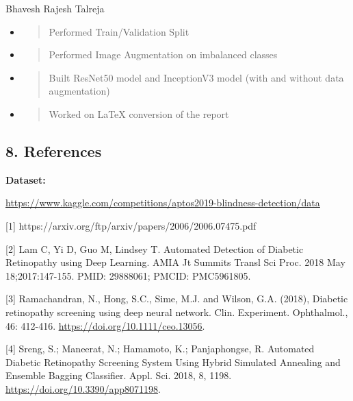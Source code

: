 \documentclass[
]{article}
\begin{document}
Bhavesh Rajesh Talreja

\begin{itemize}
\item
  \begin{quote}
  Performed Train/Validation Split
  \end{quote}
\end{itemize}

\begin{itemize}
\item
  \begin{quote}
  Performed Image Augmentation on imbalanced classes
  \end{quote}
\item
  \begin{quote}
  Built ResNet50 model and InceptionV3 model (with and without data
  augmentation)
  \end{quote}
\item
  \begin{quote}
  Worked on LaTeX conversion of the report
  \end{quote}
\end{itemize}

\hypertarget{references}{%
\subsection{\texorpdfstring{\textbf{8. References}}{References}}\label{references}}

\textbf{Dataset:}

\href{https://www.kaggle.com/competitions/aptos2019-blindness-detection/data}{\underline{https://www.kaggle.com/competitions/aptos2019-blindness-detection/data}}

{[}1{]} https://arxiv.org/ftp/arxiv/papers/2006/2006.07475.pdf

{[}2{]} Lam C, Yi D, Guo M, Lindsey T. Automated Detection of Diabetic
Retinopathy using Deep Learning. AMIA Jt Summits Transl Sci Proc. 2018
May 18;2017:147-155. PMID: 29888061; PMCID: PMC5961805.

{[}3{]} Ramachandran, N., Hong, S.C., Sime, M.J. and Wilson, G.A.
(2018), Diabetic retinopathy screening using deep neural network. Clin.
Experiment. Ophthalmol., 46: 412-416.
\href{https://doi.org/10.1111/ceo.13056}{\underline{https://doi.org/10.1111/ceo.13056}}.

{[}4{]} Sreng, S.; Maneerat, N.; Hamamoto, K.; Panjaphongse, R.
Automated Diabetic Retinopathy Screening System Using Hybrid Simulated
Annealing and Ensemble Bagging Classifier. Appl. Sci. 2018, 8, 1198.
\href{https://doi.org/10.3390/app8071198}{\underline{https://doi.org/10.3390/app8071198}}.
\end{document}
